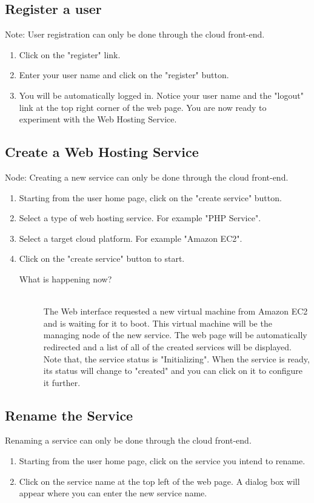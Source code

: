 \documentclass[12pt]{article}
\newenvironment{what}
{\begin{description} \item [What is happening now?] \hfill \\}
{\end{description}}
\begin{document}
\subsection{Register a user}
Note: User registration can only be done through the cloud front-end.
\begin{enumerate}
\item Click on the "register" link.
\item Enter your user name and click on the "register" button.
\item You will be automatically logged in. Notice your user name and the "logout"
      link at the top right corner of the web page. You are now ready to
      experiment with the Web Hosting Service.
\end{enumerate}

\subsection{Create a Web Hosting Service}
Node: Creating a new service can only be done through the cloud front-end. 
\begin{enumerate}
\item Starting from the user home page, click on the "create service" button.
\item Select a type of web hosting service. For example "PHP Service".
\item Select a target cloud platform. For example "Amazon EC2".
\item Click on the "create service" button to start.
 \begin{what}
  The Web interface requested a new virtual machine from Amazon EC2 and
  is waiting for it to boot. This virtual machine will be the managing
  node of the new service. The web page will be automatically redirected
  and a list of all of the created services will be displayed.
  Note that, the service status is "Initializing". When the service is
  ready, its status will change to "created" and you can click on it to
  configure it further.
 \end{what}
\end{enumerate}

\subsection{Rename the Service}
Renaming a service can only be done through the cloud front-end. 
\begin{enumerate}
\item Starting from the user home page, click on the service you intend to
      rename.
\item Click on the service name at the top left of the web
      page. A dialog box will appear where you can enter the new service
      name.
\end{enumerate}
\end{document}
